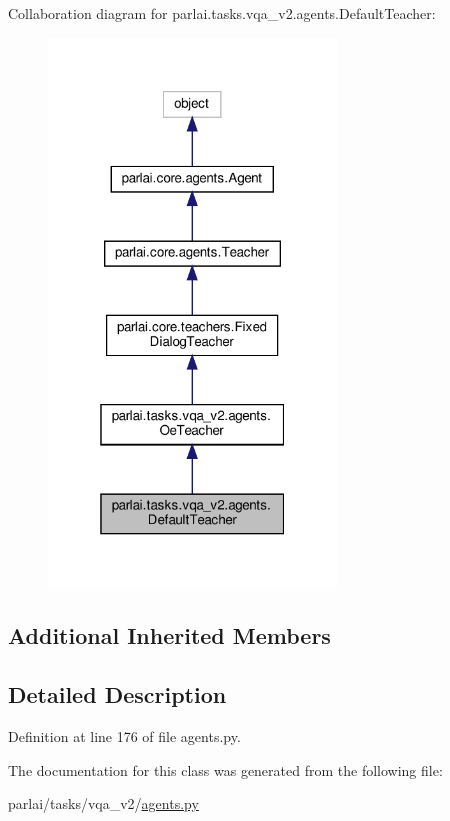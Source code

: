 Collaboration diagram for parlai.\+tasks.\+vqa\+\_\+v2.\+agents.\+Default\+Teacher\+:\nopagebreak
\begin{figure}[H]
\begin{center}
\leavevmode
\includegraphics[width=217pt]{da/d81/classparlai_1_1tasks_1_1vqa__v2_1_1agents_1_1DefaultTeacher__coll__graph}
\end{center}
\end{figure}
\subsection*{Additional Inherited Members}


\subsection{Detailed Description}


Definition at line 176 of file agents.\+py.



The documentation for this class was generated from the following file\+:\begin{DoxyCompactItemize}
\item 
parlai/tasks/vqa\+\_\+v2/\hyperlink{parlai_2tasks_2vqa__v2_2agents_8py}{agents.\+py}\end{DoxyCompactItemize}
